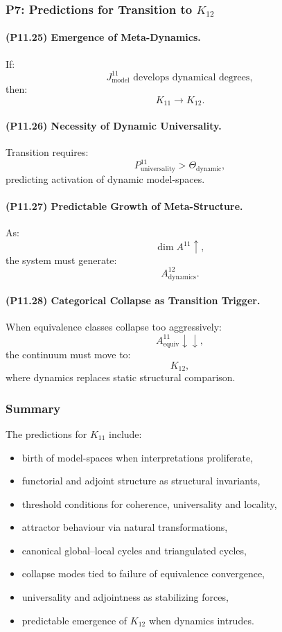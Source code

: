\subsubsection{P7: Predictions for Transition to $K_{12}$}

\paragraph{(P11.25) Emergence of Meta-Dynamics.}
If:
\[
J_{\mathrm{model}}^{11}
\text{ develops dynamical degrees},
\]
then:
\[
K_{11} \to K_{12}.
\]

\paragraph{(P11.26) Necessity of Dynamic Universality.}
Transition requires:
\[
P_{\mathrm{universality}}^{11} 
> \Theta_{\mathrm{dynamic}},
\]
predicting activation of dynamic model-spaces.

\paragraph{(P11.27) Predictable Growth of Meta-Structure.}
As:
\[
\dim A^{11} \uparrow,
\]
the system must generate:
\[
A_{\mathrm{dynamics}}^{12}.
\]

\paragraph{(P11.28) Categorical Collapse as Transition Trigger.}
When equivalence classes collapse too aggressively:
\[
A_{\mathrm{equiv}}^{11} \downarrow \downarrow,
\]
the continuum must move to:
\[
K_{12},
\]
where dynamics replaces static structural comparison.

\subsubsection{Summary}

The predictions for $K_{11}$ include:
\begin{itemize}
    \item birth of model-spaces when interpretations proliferate,
    \item functorial and adjoint structure as structural invariants,
    \item threshold conditions for coherence, universality and locality,
    \item attractor behaviour via natural transformations,
    \item canonical global–local cycles and triangulated cycles,
    \item collapse modes tied to failure of equivalence convergence,
    \item universality and adjointness as stabilizing forces,
    \item predictable emergence of $K_{12}$ when dynamics intrudes.
\end{itemize}
